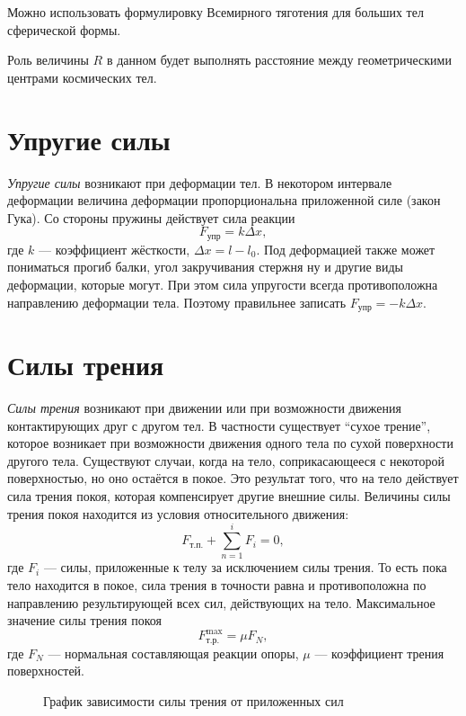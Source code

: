 Можно использовать формулировку Всемирного тяготения для больших тел
сферической формы.

Роль величины \( R \) в данном будет выполнять расстояние между геометрическими
центрами космических тел.

\section{Упругие силы}%

\emph{Упругие силы} возникают при деформации тел. В некотором интервале
деформации величина деформации пропорциональна приложенной силе (закон Гука).
Со стороны пружины действует сила реакции \[
  F_\text{упр} = k \Delta x
,\] где \( k \) --- коэффициент жёсткости, \( \Delta x = l - l_0 \). Под
деформацией также может пониматься прогиб балки, угол закручивания стержня ну
и другие виды деформации, которые могут. При этом сила упругости всегда
противоположна направлению деформации тела. Поэтому правильнее записать \(
F_\text{упр} = - k \Delta x \).

\section{Силы трения}%

\emph{Силы трения} возникают при движении или при возможности движения
контактирующих друг с другом тел. В частности существует ``сухое трение'',
которое возникает при возможности движения одного тела по сухой поверхности
другого тела. Существуют случаи, когда на тело, соприкасающееся с некоторой
поверхностью, но оно остаётся в покое. Это результат того, что на тело
действует сила трения покоя, которая компенсирует другие внешние силы. Величины
силы трения покоя находится из условия относительного движения: \[
  F_\text{т.п.} + \sum_{n=1}^{i} F_i = 0
,\] где \( F_i \) --- силы, приложенные к телу за исключением силы трения. То
есть пока тело находится в покое, сила трения в точности равна и
противоположна по направлению результирующей всех сил, действующих на тело.
Максимальное значение силы трения покоя \[
  F_\text{т.р.}^\text{max} = \mu F_N
,\] где \( F_N \) --- нормальная составляющая реакции опоры, \( \mu \) ---
коэффициент трения поверхностей.

\begin{figure}[!htbp]
  \begin{center}
  \end{center}
  \caption{График зависимости силы трения от приложенных сил}%
  \label{fig:depends-Ftr-Fi}
\end{figure}

